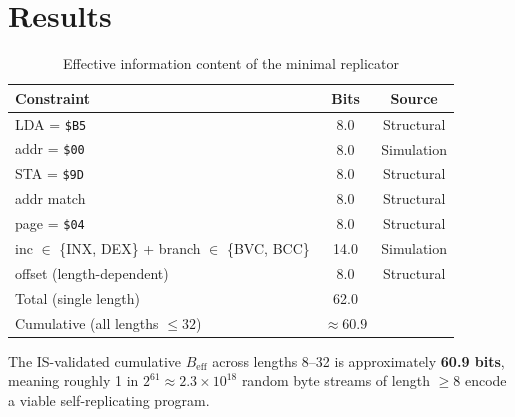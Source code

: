 \documentclass{article}
\newcommand{\hex}[1]{\texttt{\$#1}}
\newcommand{\Beff}{B_{\mathrm{eff}}}
\begin{document}
\section{Results}

\begin{table}[h]
\centering
\caption{Effective information content of the minimal replicator}
\begin{tabular}{lcc}
\toprule
Constraint & Bits & Source \\
\midrule
LDA = \hex{B5} & 8.0 & Structural \\
addr = \hex{00} & 8.0 & Simulation \\
STA = \hex{9D} & 8.0 & Structural \\
addr match & 8.0 & Structural \\
page = \hex{04} & 8.0 & Structural \\
inc $\in$ \{INX, DEX\} + branch $\in$ \{BVC, BCC\} & 14.0 & Simulation \\
offset (length-dependent) & 8.0 & Structural \\
\midrule
Total (single length) & 62.0 & \\
Cumulative (all lengths $\le 32$) & $\approx 60.9$ & \\
\bottomrule
\end{tabular}
\end{table}

The IS-validated cumulative $\Beff$ across lengths 8--32 is
approximately \textbf{60.9 bits}, meaning roughly 1 in $2^{61}
\approx 2.3 \times 10^{18}$ random byte streams of length $\ge 8$
encode a viable self-replicating program.
\end{document}
